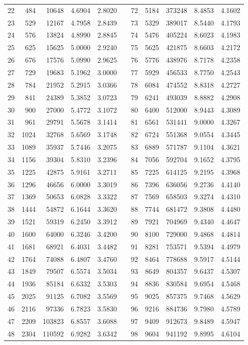 \begin{longtable}{rrrrrrrrrrr}
22&484&10648&4.6904&2.8020&&72&5184&373248&8.4853&4.1602\\
23&529&12167&4.7958&2.8439&&73&5329&389017&8.5440&4.1793\\
24&576&13824&4.8990&2.8845&&74&5476&405224&8.6023&4.1983\\
25&625&15625&5.0000&2.9240&&75&5625&421875&8.6603&4.2172\\
26&676&17576&5.0990&2.9625&&76&5776&438976&8.7178&4.2358\\
27&729&19683&5.1962&3.0000&&77&5929&456533&8.7750&4.2543\\
28&784&21952&5.2915&3.0366&&78&6084&474552&8.8318&4.2727\\
29&841&24389&5.3852&3.0723&&79&6241&493039&8.8882&4.2908\\
30&900&27000&5.4772&3.1072&&80&6400&512000&8.9443&4.3089\\
31&961&29791&5.5678&3.1414&&81&6561&531441&9.0000&4.3267\\
32&1024&32768&5.6569&3.1748&&82&6724&551368&9.0554&4.3445\\
33&1089&35937&5.7446&3.2075&&83&6889&571787&9.1104&4.3621\\
34&1156&39304&5.8310&3.2396&&84&7056&592704&9.1652&4.3795\\
35&1225&42875&5.9161&3.2711&&85&7225&614125&9.2195&4.3968\\
36&1296&46656&6.0000&3.3019&&86&7396&636056&9.2736&4.4140\\
37&1369&50653&6.0828&3.3322&&87&7569&658503&9.3274&4.4310\\
38&1444&54872&6.1644&3.3620&&88&7744&681472&9.3808&4.4480\\
39&1521&59319&6.2450&3.3912&&89&7921&704969&9.4340&4.4647\\
40&1600&64000&6.3246&3.4200&&90&8100&729000&9.4868&4.4814\\
41&1681&68921&6.4031&3.4482&&91&8281&753571&9.5394&4.4979\\
42&1764&74088&6.4807&3.4760&&92&8464&778688&9.5917&4.5144\\
43&1849&79507&6.5574&3.5034&&93&8649&804357&9.6437&4.5307\\
44&1936&85184&6.6332&3.5303&&94&8836&830584&9.6954&4.5468\\
45&2025&91125&6.7082&3.5569&&95&9025&857375&9.7468&4.5629\\
46&2116&97336&6.7823&3.5830&&96&9216&884736&9.7980&4.5789\\
47&2209&103823&6.8557&3.6088&&97&9409&912673&9.8489&4.5947\\
48&2304&110592&6.9282&3.6342&&98&9604&941192&9.8995&4.6104\\

\end{longtable}
